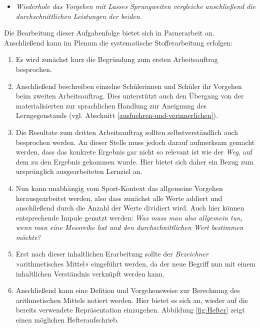 \documentclass[
]{scrbook}
\providecommand{\tightlist}{%
  \setlength{\itemsep}{0pt}\setlength{\parskip}{0pt}}
\theoremstyle{definition}
\theoremstyle{definition}
\theoremstyle{definition}
\theoremstyle{definition}
\theoremstyle{remark}
\begin{document}
\begin{itemize}
\tightlist
\item
  \emph{Wiederhole das Vorgehen mit Lasses Sprungweiten vergleiche anschließend die durchschnittlichen Leistungen der beiden.}
\end{itemize}

Die Bearbeitung dieser Aufgabenfolge bietet sich in Parnerarbeit an. Anschließend kann im Plenum die systematische Stofferarbeitung erfolgen:

\begin{enumerate}
\def\labelenumi{\arabic{enumi}.}
\tightlist
\item
  Es wird zunächst kurz die Begründung zum ersten Arbeitsauftrag besprochen.
\item
  Anschließend beschreiben einzelne Schülerinnen und Schüler ihr Vorgehen beim zweiten Arbeitsauftrag. Dies unterstützt auch den Übergang von der materialisierten zur sprachlichen Handlung zur Aneignung des Lerngegenstands (vgl. Abschnitt \ref{ausfuehren-und-verinnerlichen}).
\item
  Die Resultate zum dritten Arbeitsauftrag sollten selbstverständlich auch besprochen werden. An dieser Stelle muss jedoch darauf aufmerksam gemacht werden, dass das konkrete Ergebnis gar nicht so relevant ist wie der \emph{Weg}, auf dem zu den Ergebnis gekommen wurde. Hier bietet sich daher ein Bezug zum ursprünglich ausgearbeiteten Lernziel an.
\item
  Nun kann unabhängig vom Sport-Kontext das allgemeine Vorgehen herausgearbeitet werden, also dass zunächst alle Werte addiert und anschließend durch die Anzahl der Werte dividiert wird. Auch hier können entsprechende Impule genutzt werden: \emph{Was muss man also allgemein tun, wenn man eine Messreihe hat und den durchschnittlichen Wert bestimmen möchte?}
\item
  Erst nach dieser inhaltlichen Erarbeitung sollte der \emph{Bezeichner} »arithmetisches Mittel« eingeführt werden, da der neue Begriff nun mit einem inhaltlichen Verständnis verknüpft werden kann.
\item
  Anschließend kann eine Defition und Vorgehensweise zur Berechnung des arithmetischen Mittels notiert werden. Hier bietet es sich an, wieder auf die bereits verwendete Repräsentation einzugehen. Abbildung \ref{fig:Hefter} zeigt einen möglichen Hefteraufschrieb.
\end{enumerate}
\end{document}
